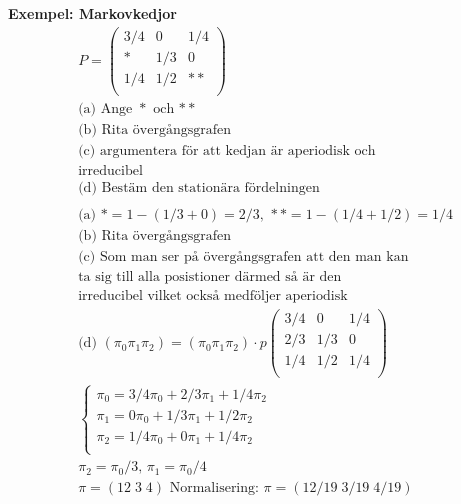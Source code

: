 \begin{multicols}{2}
\textbf{Exempel: Markovkedjor}
\begin{align*}
  &P=
   \left(\begin{array}{ccc}
    3/4 & 0 & 1/4 \\
    * & 1/3 & 0 \\
    1/4 & 1/2 & ** \\
  \end{array}\right) \\
  &\text{(a) Ange $*$ och $**$} \\
  &\text{(b) Rita övergångsgrafen} \\
  &\text{(c) argumentera för att kedjan är aperiodisk och} \\
  &\text{irreducibel} \\
  &\text{(d) Bestäm den stationära fördelningen} \\
  &\\
  &\text{(a) } *=1 -(1/3+0) = 2/3, \, **= 1-(1/4+1/2)=1/4 \\
  &\text{(b) Rita övergångsgrafen} \\
  &\text{(c) Som man ser på övergångsgrafen att den man kan} \\
  &\text{ta sig till alla posistioner därmed så är den} \\
  &\text{irreducibel vilket också medföljer aperiodisk} \\
  &\text{(d) } (\pi_0 \pi_1 \pi_2) = (\pi_0 \pi_1 \pi_2)\cdot{p}
   \left(\begin{array}{ccc}
    3/4 & 0 & 1/4 \\
    2/3 & 1/3 & 0 \\
    1/4 & 1/2 & 1/4 \\
  \end{array}\right) \\
  &\left\{\begin{array}{rr}
  \pi_0 = 3/4\pi_0 + 2/3\pi_1 + 1/4\pi_2 \\
  \pi_1 = 0\pi_0 + 1/3\pi_1 + 1/2\pi_2 \\
  \pi_2 = 1/4\pi_0 + 0\pi_1 + 1/4\pi_2 \\
  \end{array}\right. \\
  &\pi_2=\pi_0/3, \, \pi_1=\pi_0/4 \\
  &\pi = (12 \; 3 \; 4) \text{ Normalisering: } \pi = (12/19 \; 3/19 \; 4/19) \\
\end{align*}


\end{multicols}

